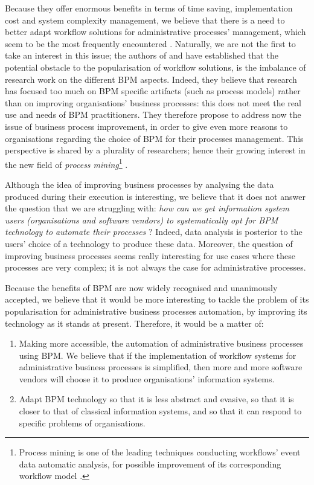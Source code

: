 Because they offer enormous benefits in terms of time saving, implementation cost and system complexity management, we believe that there is a need to better adapt workflow solutions for administrative processes' management, which seem to be the most frequently encountered \cite{mcCready, van1998application, dumas2005process}. Naturally, we are not the first to take an interest in this issue; the authors of \cite{dumas2015models} and \cite{van2016don} have established that the potential obstacle to the popularisation of workflow solutions, is the imbalance of research work on the different BPM aspects. Indeed, they believe that research has focused too much on BPM specific artifacts (such as process models) rather than on improving organisations' business processes: this does not meet the real use and needs of BPM practitioners. They therefore propose to address now the issue of business process improvement, in order to give even more reasons to organisations regarding the choice of BPM for their processes management. This perspective is shared by a plurality of researchers; hence their growing interest in the new field of \textit{process mining}\footnote{Process mining is one of the leading techniques conducting workflows' event data automatic analysis, for possible improvement of its corresponding workflow model \cite{van2013business}.} \cite{van2011process}. 

Although the idea of improving business processes by analysing the data produced during their execution is interesting, we believe that it does not answer the question that we are struggling with: \textit{how can we get information system users (organisations and software vendors) to systematically opt for BPM technology to automate their processes} ? Indeed, data analysis is posterior to the users' choice of a technology to produce these data. Moreover, the question of improving business processes seems really interesting for use cases where these processes are very complex; it is not always the case for administrative processes. 




\label{chap0:sec:our-global-vision}
Because the benefits of BPM are now widely recognised and unanimously accepted, we believe that it would be more interesting to tackle the problem of its popularisation for administrative business processes automation, by improving its technology as it stands at present. Therefore, it would be a matter of:
\begin{enumerate}
	\item Making more accessible, the automation of administrative business processes using BPM. We believe that if the implementation of workflow systems for administrative business processes is simplified, then more and more software vendors will choose it to produce organisations' information systems.
	\item Adapt BPM technology so that it is less abstract and evasive, so that it is closer to that of classical information systems, and so that it can respond to specific problems of organisations.
\end{enumerate}

